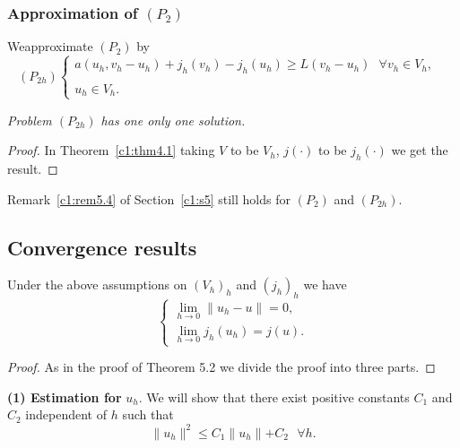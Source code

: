 \subsubsection{Approximation of $(P_2)$}\label{c1:sss6.2.3}%

We\pageoriginale approximate $(P_2)$ by 
\begin{equation*}
(P_{2h})
\begin{cases}
a(u_h, v_h - u_h) + j_h(v_h) - j_h(u_h) \geq L(v_h - u_h) ~~~\forall
v_h \in V_h, \\ 
&\\
u_h \in V_h.
\end{cases}
\end{equation*}

\begin{theorem}\label{c1:thm6.1}%
{\em Problem $(P_{2h})$ has one only one solution.}
\end{theorem}

\begin{proof}
In Theorem~\ref{c1:thm4.1} taking $V$ to be $V_h$, $j(\cdot)$ to be
$j_h(\cdot)$ we get the result. 
\end{proof}

\begin{remark}%
  Remark~\ref{c1:rem5.4} of Section~\ref{c1:s5} still holds for $(P_2)$
  and $(P_{2h})$. 
\end{remark}

\subsection{Convergence results}\label{c1:ss6.3}%

\begin{theorem}\label{c1:thm6.2}%
Under the above assumptions on $(V_h)_h$ and $(j_h)_h$ we have 
\begin{equation}
\begin{cases}
\lim \limits_{h \to 0} \parallel u_h -u \parallel = 0,\\
\lim \limits_{h \to 0} j_h(u_h) = j(u).
\end{cases}\tag{6.3}\label{c1:eq6.3}
\end{equation}
\end{theorem}
\begin{proof}
As in the proof of Theorem 5.2 we divide the proof into three parts.
\end{proof}

\textbf{(1) Estimation for }$u_h$. We will show that there exist
positive constants $C_1$ and $C_2$ independent of $h$ such that  
\begin{equation}
\parallel u_h \parallel^2 \leq C_1 \parallel u_h \parallel + C_2 ~~~
\forall h. \tag{6.4}\label{c1:eq6.4} 
\end{equation}


